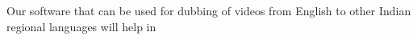 \documentclass[preview]{standalone}
\begin{document}
\begin{flushleft}
\fontsize{15}{0}\selectfont Our software that can be used for dubbing of videos from English to other Indian regional languages will help in
\end{flushleft}
\end{document}
